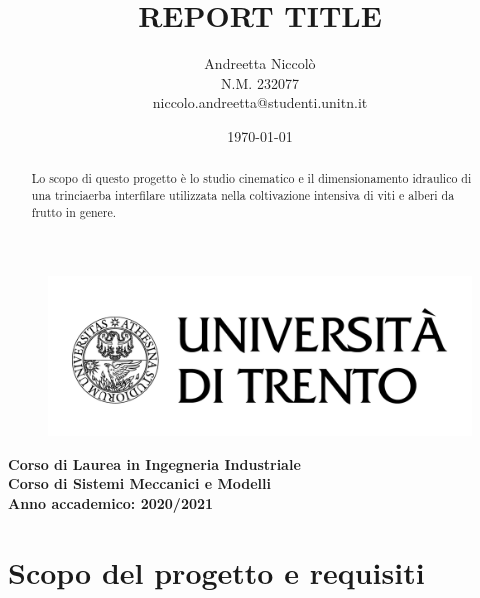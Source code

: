 \documentclass[a4paper,12pt]{article}
\title{\textbf{REPORT TITLE}}
\author{Andreetta Niccolò\\
N.M. 232077\\
niccolo.andreetta@studenti.unitn.it
}
\date{\today}
\begin{document}
\begin{figure}[H]
    \centering
    \includegraphics[scale=0.15]{immagini/logo-unitn.png}
    \maketitle
\end{figure}
\begin{center}\textbf{
    Corso di Laurea in Ingegneria Industriale\\
    Corso di {Sistemi Meccanici e Modelli}\\
    Anno accademico: 2020/2021}
\vspace{2cm}
\begin{abstract}\centering
Lo scopo di questo progetto è lo studio cinematico e il dimensionamento idraulico di una trinciaerba interfilare utilizzata nella coltivazione intensiva di viti e alberi da frutto in genere.
\end{abstract}
\end{center}
\thispagestyle{empty}
\newpage
\tableofcontents
\listoffigures
\thispagestyle{empty}
\newpage
\setcounter{page}{3}
\section{Scopo del progetto e requisiti }
\end{document}
